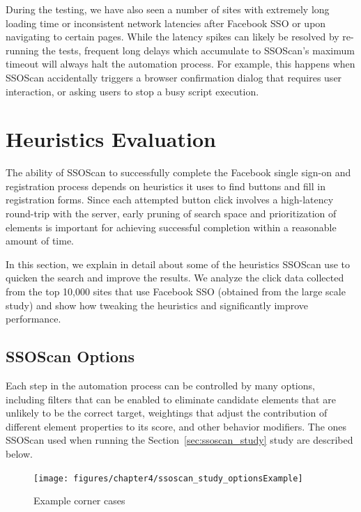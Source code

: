  During the testing, we have also seen a number of sites with extremely long loading time or inconsistent network latencies after Facebook SSO or upon navigating to certain pages.  While the latency spikes can likely be resolved by re-running the tests, frequent long delays which accumulate to SSOScan's maximum timeout will always halt the automation process.  For example, this happens when SSOScan accidentally triggers a browser confirmation dialog that requires user interaction, or asking users to stop a busy script execution.


\section{Heuristics Evaluation}
\label{sec:ssoscan_heuristics}

The ability of SSOScan to successfully complete the Facebook single sign-on and registration process depends on heuristics it uses to find buttons and fill in registration forms.  Since each attempted button click involves a high-latency round-trip with the server, early pruning of search space and prioritization of elements is important for achieving successful completion within a reasonable amount of time.

In this section, we explain in detail about some of the heuristics SSOScan use to quicken the search and improve the results.  We analyze the click data collected from the top 10,000 sites that use Facebook SSO (obtained from the large scale study) and show how tweaking the heuristics and significantly improve performance.

\subsection{SSOScan Options}
\label{sec:ssoscan_heuristics_options}

Each step in the automation process can be controlled by many options, including filters that can be enabled to eliminate candidate elements that are unlikely to be the correct target, weightings that adjust the contribution of different element properties to its score, and other behavior modifiers.  The ones SSOScan used when running the Section~\ref{sec:ssoscan_study} study are described below.

\begin{figure}[hbt]
\centering
\texttt{[image: figures/chapter4/ssoscan\_study\_optionsExample]}
\caption{Example corner cases}
\label{fig:ssoscan_study_optionsExample}
\end{figure}

